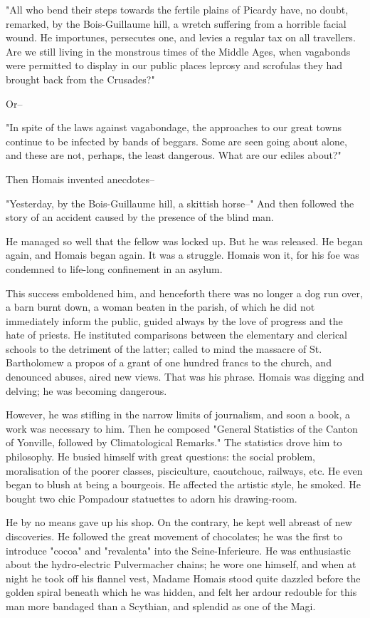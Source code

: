 \documentclass[11pt,twocolumn]{ltugboat}
\begin{document}
"All who bend their steps towards the fertile plains of Picardy have, no
doubt, remarked, by the Bois-Guillaume hill, a wretch suffering from
a horrible facial wound. He importunes, persecutes one, and levies a
regular tax on all travellers. Are we still living in the monstrous
times of the Middle Ages, when vagabonds were permitted to display in
our public places leprosy and scrofulas they had brought back from the
Crusades?"

Or--

"In spite of the laws against vagabondage, the approaches to our great
towns continue to be infected by bands of beggars. Some are seen going
about alone, and these are not, perhaps, the least dangerous. What are
our ediles about?"

Then Homais invented anecdotes--

"Yesterday, by the Bois-Guillaume hill, a skittish horse--" And then
followed the story of an accident caused by the presence of the blind
man.

He managed so well that the fellow was locked up. But he was released.
He began again, and Homais began again. It was a struggle. Homais won
it, for his foe was condemned to life-long confinement in an asylum.

This success emboldened him, and henceforth there was no longer a dog
run over, a barn burnt down, a woman beaten in the parish, of which
he did not immediately inform the public, guided always by the love of
progress and the hate of priests. He instituted comparisons between the
elementary and clerical schools to the detriment of the latter; called
to mind the massacre of St. Bartholomew a propos of a grant of one
hundred francs to the church, and denounced abuses, aired new views.
That was his phrase. Homais was digging and delving; he was becoming
dangerous.

However, he was stifling in the narrow limits of journalism, and soon a
book, a work was necessary to him. Then he composed "General Statistics
of the Canton of Yonville, followed by Climatological Remarks." The
statistics drove him to philosophy. He busied himself with great
questions: the social problem, moralisation of the poorer classes,
pisciculture, caoutchouc, railways, etc. He even began to blush at being
a bourgeois. He affected the artistic style, he smoked. He bought two
chic Pompadour statuettes to adorn his drawing-room.

He by no means gave up his shop. On the contrary, he kept well abreast
of new discoveries. He followed the great movement of chocolates; he
was the first to introduce "cocoa" and "revalenta" into the
Seine-Inferieure. He was enthusiastic about the hydro-electric
Pulvermacher chains; he wore one himself, and when at night he took off
his flannel vest, Madame Homais stood quite dazzled before the golden
spiral beneath which he was hidden, and felt her ardour redouble for
this man more bandaged than a Scythian, and splendid as one of the Magi.
\end{document}
